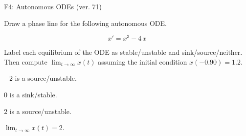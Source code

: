 \begin{exercise}
  \begin{exerciseTitle}F4: Autonomous ODEs (ver. 71)\end{exerciseTitle}
  \begin{exerciseStatement}
    

      Draw a phase line for the following 
      autonomous ODE.
    

    
\[x'= x^{3} - 4 \, x\]

    

      Label each equilibrium of the ODE
      as stable/unstable and sink/source/neither.
      Then compute \(\lim_{t\to\infty}x(t)\)
      assuming the initial condition
      \(x( -0.90 )= 1.2\).
    

  \end{exerciseStatement}
  \begin{exerciseAnswer}
    

      \(-2\) is a source/unstable.
      
        \(0\) is a sink/stable.
      
      \(2\) is a source/unstable.
    

    

      \(\lim_{t\to\infty}x(t)=2\).
    

  \end{exerciseAnswer}
\end{exercise}
